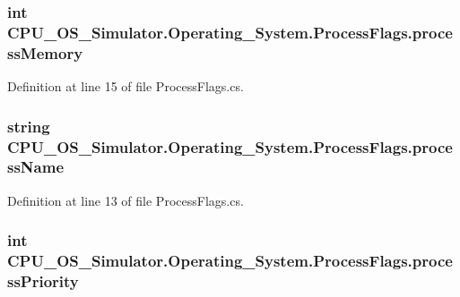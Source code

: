 \subsubsection[{process\+Memory}]{\setlength{\rightskip}{0pt plus 5cm}int C\+P\+U\+\_\+\+O\+S\+\_\+\+Simulator.\+Operating\+\_\+\+System.\+Process\+Flags.\+process\+Memory}\label{struct_c_p_u___o_s___simulator_1_1_operating___system_1_1_process_flags_a2ed1133d00c4d6d39f9e5cd70febbacb}


Definition at line 15 of file Process\+Flags.\+cs.

\hypertarget{struct_c_p_u___o_s___simulator_1_1_operating___system_1_1_process_flags_a2823e57851d2940c47cd06afd0487360}{}
\subsubsection[{process\+Name}]{\setlength{\rightskip}{0pt plus 5cm}string C\+P\+U\+\_\+\+O\+S\+\_\+\+Simulator.\+Operating\+\_\+\+System.\+Process\+Flags.\+process\+Name}\label{struct_c_p_u___o_s___simulator_1_1_operating___system_1_1_process_flags_a2823e57851d2940c47cd06afd0487360}


Definition at line 13 of file Process\+Flags.\+cs.

\hypertarget{struct_c_p_u___o_s___simulator_1_1_operating___system_1_1_process_flags_a0a14c1f617bd3cd4d2b28b5f13cf83d5}{}
\subsubsection[{process\+Priority}]{\setlength{\rightskip}{0pt plus 5cm}int C\+P\+U\+\_\+\+O\+S\+\_\+\+Simulator.\+Operating\+\_\+\+System.\+Process\+Flags.\+process\+Priority}\label{struct_c_p_u___o_s___simulator_1_1_operating___system_1_1_process_flags_a0a14c1f617bd3cd4d2b28b5f13cf83d5}


